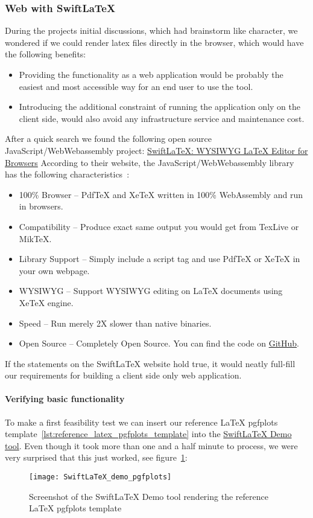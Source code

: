 \subsubsection{Web with SwiftLaTeX}
During the projects initial discussions, which had brainstorm like character, we wondered if we could render latex files directly in the browser, which would have the following benefits:
\begin{itemize}
    \item Providing the functionality as a web application would be probably the easiest and most accessible way for an end user to use the tool.
    \item Introducing the additional constraint of running the application only on the client side, would also avoid any infrastructure service and maintenance cost.
\end{itemize}
After a quick search we found the following open source JavaScript/WebWebassembly project: \href{https://www.swiftlatex.com/}{SwiftLaTeX: WYSIWYG LaTeX Editor for Browsers}
According to their website, the JavaScript/WebWebassembly library has the following characteristics~\cite{swiftlatex_website}:
\begin{itemize}
    \item 100\% Browser – PdfTeX and XeTeX written in 100\% WebAssembly and run in browsers.
    \item Compatibility – Produce exact same output you would get from TexLive or MikTeX\@.
    \item Library Support – Simply include a script tag and use PdfTeX or XeTeX in your own webpage.
    \item WYSIWYG – Support WYSIWYG editing on LaTeX documents using XeTeX engine.
    \item Speed – Run merely 2X slower than native binaries.
    \item Open Source – Completely Open Source. You can find the code on \href{https://github.com/SwiftLaTeX/SwiftLaTeX/}{GitHub}.
\end{itemize}
If the statements on the SwiftLaTeX website hold true, it would neatly full-fill our requirements for building a client side only web application.

\paragraph{Verifying basic functionality}\mbox{}\newline
To make a first feasibility test we can insert our reference LaTeX pgfplots template~\ref{lst:reference_latex_pgfplots_template} into the \href{https://www.SwiftLaTeX.com/\#demo}{SwiftLaTeX Demo tool}.
Even though it took more than one and a half minute to process, we were very surprised that this just worked, see figure~\ref{fig:SwiftLaTeX_demo_rendering_latex_pgfplots_template}:
\begin{figure}[H]
    \centering
    \texttt{[image: SwiftLaTeX\_demo\_pgfplots]}
    \caption{Screenshot of the SwiftLaTeX Demo tool rendering the reference LaTeX pgfplots template}\label{fig:SwiftLaTeX_demo_rendering_latex_pgfplots_template}
\end{figure}

